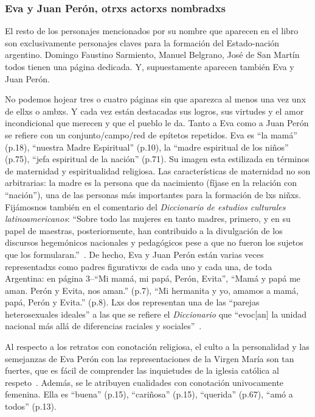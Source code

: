 \documentclass[
10pt, %
a4paper, %
oneside, %
headinclude,footinclude, %
]{scrartcl}
\begin{document}

\subsubsection{Eva y Juan Perón, otrxs actorxs nombradxs}
El resto de los personajes mencionados por su nombre que aparecen en el libro son exclusivamente personajes claves para la formación del Estado-nación argentino.
Domingo Faustino Sarmiento, Manuel Belgrano, José de San Martín todos tienen una página dedicada.
Y, supuestamente aparecen también Eva y Juan Perón.

No podemos hojear tres o cuatro páginas sin que aparezca al menos una vez unx de ellxs o ambxs.
Y cada vez están destacadas sus logros, sus virtudes y el amor incondicional que merecen y que el pueblo le da.
Tanto a Eva como a Juan Perón se refiere con un conjunto/campo/red de epítetos repetidos.
Eva es ``la mamá'' (p.18), ``nuestra Madre Espiritual'' (p.10), la ``madre espiritual de los niños'' (p.75), ``jefa espiritual de la nación'' (p.71).
Su imagen esta estilizada en términos de maternidad y espiritualidad religiosa.
Las características de maternidad no son arbitrarias: la madre es la persona que da nacimiento (fíjase en la relación con ``nación''), una de las personas más importantes para la formación de lxs niñxs.
Fijámosnos también en el comentario del \textit{Diccionario de estudios culturales latinoamericanos}: ``Sobre todo las mujeres en tanto madres, primero, y en su papel de maestras, posteriormente, han contribuido a la divulgación de los discursos hegemónicos nacionales y pedagógicos pese a que no fueron los sujetos que los formularan.''~\autocite[p.190-191]{SzIr2009}.
De hecho, Eva y Juan Perón están varias veces representadxs como padres figurativxs de cada uno y cada una, de toda Argentina:
en página 3--``Mi mamá, mi papá, Perón, Evita'', ``Mamá y papá me aman. Perón y Evita, nos aman.'' (p.7), ``Mi hermanita y yo, amamos a mamá, papá, Perón y Evita.'' (p.8).
Lxs dos representan una de las ``parejas heterosexuales ideales'' a las que se refiere el \textit{Diccionario} que ``evoc[an] la unidad nacional más allá de diferencias raciales y sociales''~\autocite[p.192-193]{SzIr2009}.

Al respecto a los retratos con conotación religiosa, el culto a la personalidad y las semejanzas de Eva Perón con las representaciones de la Virgen María son tan fuertes, que es fácil de comprender las inquietudes de la iglesia católica al respeto~\autocite{Chamosa2010}.
Además, se le atribuyen cualidades con conotación univocamente femenina.
Ella es ``buena'' (p.15), ``cariñosa'' (p.15), ``querida'' (p.67), ``amó a todos'' (p.13).
\end{document}
